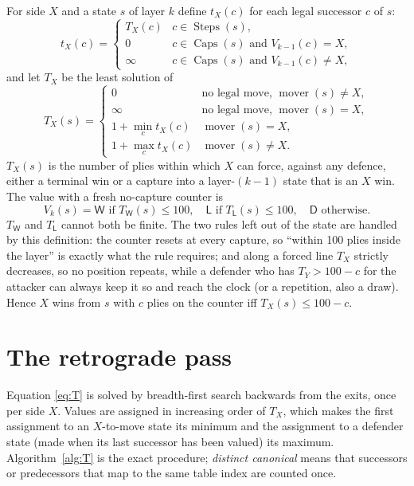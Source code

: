 \documentclass[11pt,a4paper]{article}
\newcommand{\W}{\mathsf{W}}
\newcommand{\Lb}{\mathsf{L}}
\newcommand{\D}{\mathsf{D}}
\DeclareMathOperator{\mover}{mover}
\DeclareMathOperator{\Steps}{Steps}
\DeclareMathOperator{\Caps}{Caps}
\begin{document}
For side $X$ and a state $s$ of layer $k$ define $t_X(c)$ for each legal
successor $c$ of $s$:
\[
t_X(c)=\begin{cases}
T_X(c) & c\in\Steps(s),\\
0 & c\in\Caps(s)\text{ and } V_{k-1}(c)=X,\\
\infty & c\in\Caps(s)\text{ and } V_{k-1}(c)\neq X,
\end{cases}
\]
and let $T_X$ be the least solution of
\begin{equation}\label{eq:T}
T_X(s)=\begin{cases}
0 & \text{no legal move, } \mover(s)\ne X,\\
\infty & \text{no legal move, } \mover(s)= X,\\
1+\min_c t_X(c) & \mover(s)=X,\\
1+\max_c t_X(c) & \mover(s)\ne X.
\end{cases}
\end{equation}
$T_X(s)$ is the number of plies within which $X$ can force, against any defence,
either a terminal win or a capture into a layer-$(k-1)$ state that is an $X$ win.
The value with a fresh no-capture counter is
\[
V_k(s)=\W\text{ if }T_\W(s)\le100,\quad \Lb\text{ if }T_\Lb(s)\le100,\quad \D\text{ otherwise}.
\]
$T_\W$ and $T_\Lb$ cannot both be finite. The two rules left out of the state are
handled by this definition: the counter resets at every capture, so ``within 100
plies inside the layer'' is exactly what the rule requires; and along a forced
line $T_X$ strictly decreases, so no position repeats, while a defender who has
$T_Y>100-c$ for the attacker can always keep it so and reach the clock (or a
repetition, also a draw). Hence $X$ wins from $s$ with $c$ plies on the counter
iff $T_X(s)\le 100-c$.

\section{The retrograde pass}\label{sec:pass}

Equation \eqref{eq:T} is solved by breadth-first search backwards from the
exits, once per side $X$. Values are assigned in increasing order of $T_X$, which
makes the first assignment to an $X$-to-move state its minimum and the assignment
to a defender state (made when its last successor has been valued) its maximum.
Algorithm~\ref{alg:T} is the exact procedure; \emph{distinct canonical} means
that successors or predecessors that map to the same table index are counted
once.
\end{document}

